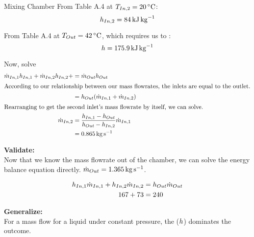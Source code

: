 \begin{example}{Mixing Chamber}
  From Table A.4 at $\Temp_{In, 2} = \SI{20}{\degreeCelsius}$:
  \begin{equation*}
    h_{In, 2} = \SI{84}{\kilo\joule\per\kilo\gram}
  \end{equation*}

  From Table A.4 at $\Temp_{Out} = \SI{42}{\degreeCelsius}$, which requires us to :
  \begin{equation*}
    h = \SI{175.9}{\kilo\joule\per\kilo\gram}
  \end{equation*}

  Now, solve
  \begin{align*}
    \dot{m}_{In, 1} h_{In, 1} + \dot{m}_{In, 2} h_{In, 2} + &= \dot{m}_{Out} h_{Out} \\
    \intertext{According to our relationship between our mass flowrates, the inlets are equal to the outlet.}
                                                                                                              &= h_{Out} (\dot{m}_{In, 1} + \dot{m}_{In, 2}) \\
    \intertext{Rearranging to get the second inlet's mass flowrate by itself, we can solve.}
    \dot{m}_{In, 2} &= \frac{h_{In, 1} - h_{Out}}{h_{Out} - h_{In, 2}} \dot{m}_{In, 1} \\
                                                                                                              &= \SI{0.865}{\kilo\gram\per\second}
  \end{align*}

  \textbf{Validate:} \\
  Now that we know the mass flowrate out of the chamber, we can solve the energy balance equation directly.
  $\dot{m}_{Out} = \SI{1.365}{\kilo\gram\per\second}$.

  \begin{align*}
    h_{In, 1} \dot{m}_{In, 1} + h_{In, 2} \dot{m}_{In, 2} &= h_{Out} \dot{m}_{Out} \\
    167 + 73 &= 240
  \end{align*}

  \textbf{Generalize:} \\
  For a mass flow for a liquid under constant pressure, the  ($h$) dominates the outcome.
\end{example}

